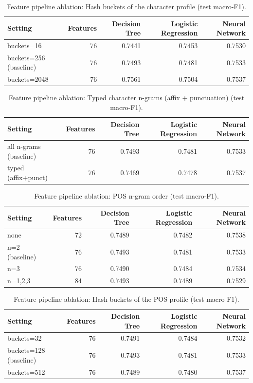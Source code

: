 \begin{table}[ht]
\centering
\small
\caption{Feature pipeline ablation: Hash buckets of the character profile (test macro-F1).}
\label{tab:pipeline-char-buckets}
\begin{tabular}{lrrrr}
\toprule
Setting & Features & Decision Tree & Logistic Regression & Neural Network \\
\midrule
buckets=16 & 76 & 0.7441 & 0.7453 & 0.7530 \\
buckets=256 (baseline) & 76 & 0.7493 & 0.7481 & 0.7533 \\
buckets=2048 & 76 & 0.7561 & 0.7504 & 0.7537 \\
\bottomrule
\end{tabular}
\end{table}

\begin{table}[ht]
\centering
\small
\caption{Feature pipeline ablation: Typed character n-grams (affix + punctuation) (test macro-F1).}
\label{tab:pipeline-char-typed}
\begin{tabular}{lrrrr}
\toprule
Setting & Features & Decision Tree & Logistic Regression & Neural Network \\
\midrule
all n-grams (baseline) & 76 & 0.7493 & 0.7481 & 0.7533 \\
typed (affix+punct) & 76 & 0.7469 & 0.7478 & 0.7537 \\
\bottomrule
\end{tabular}
\end{table}

\begin{table}[ht]
\centering
\small
\caption{Feature pipeline ablation: POS n-gram order (test macro-F1).}
\label{tab:pipeline-pos-n}
\begin{tabular}{lrrrr}
\toprule
Setting & Features & Decision Tree & Logistic Regression & Neural Network \\
\midrule
none & 72 & 0.7489 & 0.7482 & 0.7538 \\
n=2 (baseline) & 76 & 0.7493 & 0.7481 & 0.7533 \\
n=3 & 76 & 0.7490 & 0.7484 & 0.7534 \\
n=1,2,3 & 84 & 0.7493 & 0.7489 & 0.7529 \\
\bottomrule
\end{tabular}
\end{table}

\begin{table}[ht]
\centering
\small
\caption{Feature pipeline ablation: Hash buckets of the POS profile (test macro-F1).}
\label{tab:pipeline-pos-buckets}
\begin{tabular}{lrrrr}
\toprule
Setting & Features & Decision Tree & Logistic Regression & Neural Network \\
\midrule
buckets=32 & 76 & 0.7491 & 0.7484 & 0.7532 \\
buckets=128 (baseline) & 76 & 0.7493 & 0.7481 & 0.7533 \\
buckets=512 & 76 & 0.7489 & 0.7480 & 0.7537 \\
\bottomrule
\end{tabular}
\end{table}


